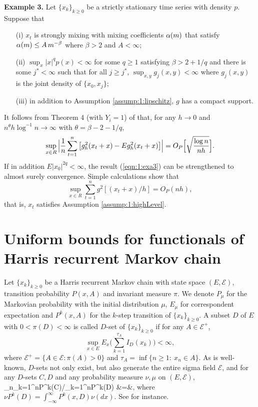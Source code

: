 \medskip
{\bf Example 3.}  Let $\{x_k\}_{k\ge0}$ be a strictly stationary time series with density $p$. Suppose that
 \begin{itemize}
\item [(i)] $x_t$ is strongly mixing with mixing coefficients $\alpha(m)$ that satisfy  $\alpha(m) \le A\, m^{-\beta}$ where $\beta > 2 $ and $A < \infty$;
\item[(ii)] $\sup_x|x|^q p(x) < \infty$ for some $q\ge 1$ satisfying $\beta>2+1/q$ and there is some $j^* < \infty$ such that for all $j \ge j^*$, $\sup_{x, y} g_j(x, y) < \infty$ where $g_j(x, y)$ is the joint density of $\{x_0, x_j\}$;
\item[(iii)] in addition to Assumption \ref{assump:1:lipschitz}, $g$ has a compact support.
\end{itemize}
 It follows from Theorem 4 (with $Y_i=1$) of \cite{hansen2008} that,
for any $h \rightarrow 0$ and $n^{\theta}h \log^{-1}n \rightarrow \infty$
with $\theta=\beta-2-1/q$,
\begin{equation}
\sup_{x \in  R} \Big | \frac{1}{n} \sum_{t =1}^{n} \big[g_h^2(x_t + x) - Eg_h^2(x_t + x)\big] \Big | = O_P \Big [\sqrt{\frac{\log n}{nh}}  \Big ]. \la {eqn:1:exa3}
\end{equation}
If in addition $E|x_0|^{2q}<\infty$, the result (\ref {eqn:1:exa3}) can be strengthened to  almost surely convergence. Simple calculations show that
\begin{equation}
\sup_{x \in  R} \sum_{t =1}^{n} g^2[(x_t + x)/h] = O_P(nh),
\end{equation}
that is, $x_t$ satisfies Assumption \ref{assump:1:highLevel}.


\section{Uniform bounds for functionals of Harris recurrent Markov chain} 

 Let $\{x_k\}_{k\ge 0}$ be a Harris recurrent Markov chain with state space $(E, \mathcal{E})$,
transition probability $P(x, A)$ and invariant measure $\pi$. We denote $P_\mu$ for the Markovian probability
with the initial distribution $\mu$, $E_\mu$ for correspondent expectation and $P^k(x, A)$
for the $k$-step transition of $\{x_k\}_{k\ge 0}$.  A subset $D$ of $E$ with $0<\pi(D)<\infty$ is called $D$-set of $\{x_k\}_{k\ge 0}$ if for any $A\in \mathcal{E}^+$,
$$
\sup_{x\in E} E_x\big(\sum_{k=1}^{\tau_A}I_D(x_k)\big)<\infty,
$$
where $ \mathcal{E}^+=\{A\in  \mathcal{E}: \pi(A)>0\}$ and $\tau_A=\inf\{n\ge 1: \ x_n\in A\}$. As is well-known,
$D$-sets not only exist,  but also generate the entire sigma field $\mathcal{E}$, and
 for any $D$-sets $C, D$ and any probability measure $\nu, \mu$ on $(E, \mathcal{E})$,
\be
\lim_{n\to\infty}\sum_{k=1}^n\nu P^k(C)/\sum_{k=1}^n\mu P^k(D) &=&, 
\ee
where $\nu P^k(D) =\int_{-\infty}^{\infty} P^k(x, D)\nu(dx)$. See \cite{nummelin2004} for instance.

